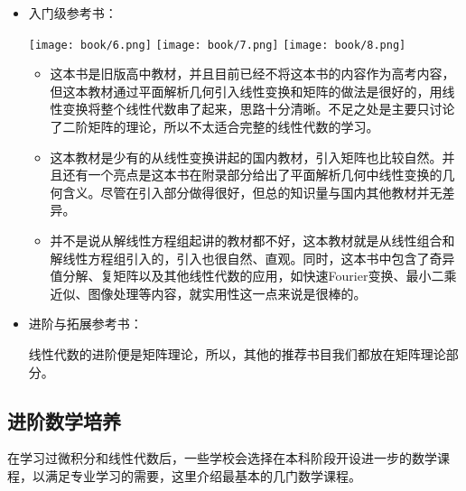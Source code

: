 \begin{itemize}
    \item 入门级参考书：
          \begin{center}
              \texttt{[image: book/6.png]} \quad
              \texttt{[image: book/7.png]} \quad
              \texttt{[image: book/8.png]}
          \end{center}

          \begin{itemize}
              \item \textcite[普通高中课程标准实验教科书\ 数学\ 选修4-2\ A版\ 矩阵与变换]{矩阵与变换}

                    这本书是旧版高中教材，并且目前已经不将这本书的内容作为高考内容，但这本教材通过平面解析几何引入线性变换和矩阵的做法是很好的，用线性变换将整个线性代数串了起来，思路十分清晰。不足之处是主要只讨论了二阶矩阵的理论，所以不太适合完整的线性代数的学习。

              \item \textcite[线性代数]{线性代数}

                    这本教材是少有的从线性变换讲起的国内教材，引入矩阵也比较自然。并且还有一个亮点是这本书在附录部分给出了平面解析几何中线性变换的几何含义。尽管在引入部分做得很好，但总的知识量与国内其他教材并无差异。

              \item \textcite[线性代数：第5版]{线性代数5}

                    并不是说从解线性方程组起讲的教材都不好，这本教材就是从线性组合和解线性方程组引入的，引入也很自然、直观。同时，这本书中包含了奇异值分解、复矩阵以及其他线性代数的应用，如快速Fourier变换、最小二乘近似、图像处理等内容，就实用性这一点来说是很棒的。
          \end{itemize}

    \item 进阶与拓展参考书：

          线性代数的进阶便是矩阵理论，所以，其他的推荐书目我们都放在矩阵理论部分。
\end{itemize}





\subsection{进阶数学培养}

在学习过微积分和线性代数后，一些学校会选择在本科阶段开设进一步的数学课程，以满足专业学习的需要，这里介绍最基本的几门数学课程。

